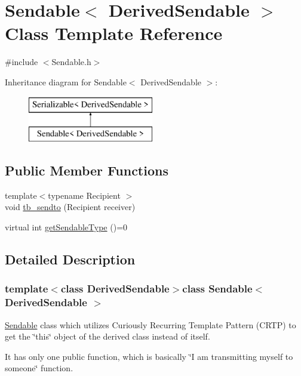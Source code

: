 \hypertarget{classSendable}{\section{Sendable$<$ Derived\-Sendable $>$ Class Template Reference}
\label{classSendable}
}


{\ttfamily \#include $<$Sendable.\-h$>$}

Inheritance diagram for Sendable$<$ Derived\-Sendable $>$\-:\begin{figure}[H]
\begin{center}
\leavevmode
\includegraphics[height=2.000000cm]{classSendable}
\end{center}
\end{figure}
\subsection*{Public Member Functions}
\begin{DoxyCompactItemize}
\item 
{\footnotesize template$<$typename Recipient $>$ }\\void \hyperlink{classSendable_acd9845338560f7c51e5e6e57d282c127}{tb\-\_\-sendto} (Recipient receiver)
\item 
virtual int \hyperlink{classSendable_a8d13bbd5c89dc4dc2da25e8f344c550e}{get\-Sendable\-Type} ()=0
\end{DoxyCompactItemize}


\subsection{Detailed Description}
\subsubsection*{template$<$class Derived\-Sendable$>$class Sendable$<$ Derived\-Sendable $>$}

\hyperlink{classSendable}{Sendable} class which utilizes Curiously Recurring Template Pattern (C\-R\-T\-P) to get the \char`\"{}this\char`\"{} object of the derived class instead of itself.

It has only one public function, which is basically \char`\"{}\-I am transmitting myself to someone\char`\"{} function.

